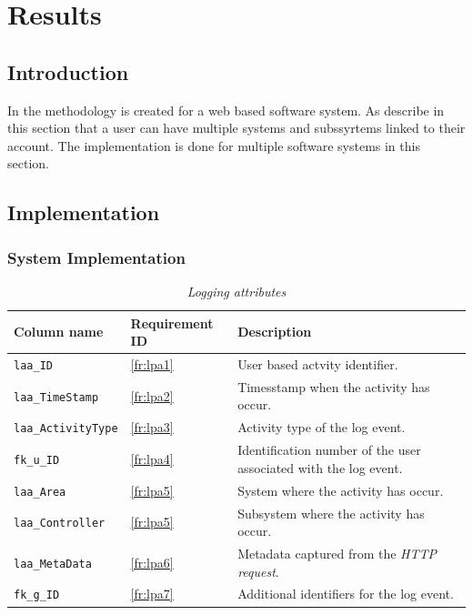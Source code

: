 \chapter{Results}
\label{chap:3}

\section{Introduction}
In  the methodology is created for a web based software system. As describe in this section that a user can have multiple systems and subssyrtems linked to their account. The implementation is done for multiple software systems in this section.

\section{Implementation}

\subsection{System Implementation}

\begin{table}[!htb]
	\centering
	\caption[Logging attributes]
	{\textit{Logging attributes}}
	\label{tbl:ch3_Log_Attributes}
	\begin{tabularx}{\textwidth}{|l|l|X|}
		\hline \textbf{Column name} & \textbf{Requirement ID} & \textbf{Description}\\
		\hline \texttt{laa\_ID} & \ref{fr:lpa1} & User based actvity identifier. \\
		\hline \texttt{laa\_TimeStamp} & \ref{fr:lpa2} & Timesstamp when the activity has occur. \\
		\hline \texttt{laa\_ActivityType} & \ref{fr:lpa3} & Activity type of the log event. \\
		\hline \texttt{fk\_u\_ID} & \ref{fr:lpa4} & Identification number of the user associated with the log event. \\
		\hline \texttt{laa\_Area} & \ref{fr:lpa5} & System where the activity has occur. \\
		\hline \texttt{laa\_Controller} & \ref{fr:lpa5} & Subsystem where the activity has occur. \\
		\hline \texttt{laa\_MetaData} & \ref{fr:lpa6} & Metadata captured from the \textit{HTTP request}. \\
		\hline \texttt{fk\_g\_ID} & \ref{fr:lpa7} & Additional identifiers for the log event. \\
		\hline
	\end{tabularx}
\end{table}

